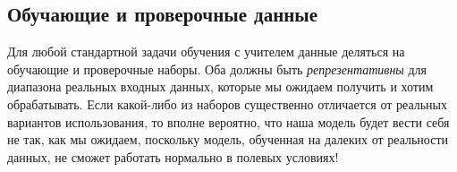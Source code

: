 \documentclass[%
	11pt,
	a4paper,
	utf8,
		]{article}
\begin{document}
\subsection{Обучающие и проверочные данные}

Для любой стандартной задачи обучения с учителем данные деляться на обучающие и проверочные наборы. Оба должны быть \emph{репрезентативны} для диапазона реальных входных данных, которые мы ожидаем получить и хотим обрабатывать. Если какой-либо из наборов существенно отличается от реальных вариантов использования, то вполне вероятно, что наша модель будет вести себя не так, как мы ожидаем, поскольку модель, обученная на далеких от реальности данных, не сможет работать нормально в полевых условиях!









\begin{thebibliography}{99}
	
\end{thebibliography}


\end{document}
